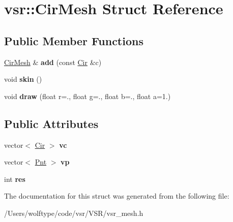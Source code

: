 \hypertarget{structvsr_1_1_cir_mesh}{\section{vsr\-:\-:Cir\-Mesh Struct Reference}
\label{structvsr_1_1_cir_mesh}
}
\subsection*{Public Member Functions}
\begin{DoxyCompactItemize}
\item 
\hypertarget{structvsr_1_1_cir_mesh_ad2367edbc55afdeb4a8e388c3e1eaf1d}{\hyperlink{structvsr_1_1_cir_mesh}{Cir\-Mesh} \& {\bfseries add} (const \hyperlink{namespacevsr_a2744605aa828e495fc85463b7ae0d045}{Cir} \&c)}\label{structvsr_1_1_cir_mesh_ad2367edbc55afdeb4a8e388c3e1eaf1d}

\item 
\hypertarget{structvsr_1_1_cir_mesh_a17dd47ced48aa745ac20bfdbbdb42ec1}{void {\bfseries skin} ()}\label{structvsr_1_1_cir_mesh_a17dd47ced48aa745ac20bfdbbdb42ec1}

\item 
\hypertarget{structvsr_1_1_cir_mesh_ac4571bed496a13c64809736762708205}{void {\bfseries draw} (float r=., float g=., float b=., float a=1.)}\label{structvsr_1_1_cir_mesh_ac4571bed496a13c64809736762708205}

\end{DoxyCompactItemize}
\subsection*{Public Attributes}
\begin{DoxyCompactItemize}
\item 
\hypertarget{structvsr_1_1_cir_mesh_a16e7020467aff71725885babf45dc36c}{vector$<$ \hyperlink{namespacevsr_a2744605aa828e495fc85463b7ae0d045}{Cir} $>$ {\bfseries vc}}\label{structvsr_1_1_cir_mesh_a16e7020467aff71725885babf45dc36c}

\item 
\hypertarget{structvsr_1_1_cir_mesh_a5428d2470277a26fbda2c4723dad00f6}{vector$<$ \hyperlink{namespacevsr_a2d05beb9721c5d9211b479af6d47222d}{Pnt} $>$ {\bfseries vp}}\label{structvsr_1_1_cir_mesh_a5428d2470277a26fbda2c4723dad00f6}

\item 
\hypertarget{structvsr_1_1_cir_mesh_a23a0e1099c224d2fbce231ad4436538f}{int {\bfseries res}}\label{structvsr_1_1_cir_mesh_a23a0e1099c224d2fbce231ad4436538f}

\end{DoxyCompactItemize}


The documentation for this struct was generated from the following file\-:\begin{DoxyCompactItemize}
\item 
/\-Users/wolftype/code/vsr/\-V\-S\-R/vsr\-\_\-mesh.\-h\end{DoxyCompactItemize}
